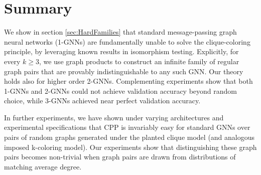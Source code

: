 \section{Summary}
We show in section \ref{sec:HardFamilies} that standard message-passing graph neural networks (1-GNNs) are fundamentally unable to solve the clique-coloring principle, by leveraging known results in isomorphism testing. Explicitly, for every $k \ge 3$, we use graph products to construct an infinite family of regular graph pairs that are provably indistinguishable to any such GNN. Our theory holds also for higher order 2-GNNs. Complementing experiments show that both 1-GNNs and 2-GNNs could not achieve validation accuracy beyond random choice, while 3-GNNs achieved near perfect validation accuracy. 

In further experiments, we have shown under varying architectures and experimental specifications that CPP is invariably easy for standard GNNs over pairs of random graphs generated under the planted clique model (and analogous imposed k-coloring model). Our experiments show that distinguishing these graph pairs becomes non-trivial when graph pairs are drawn from distributions of matching average degree.
